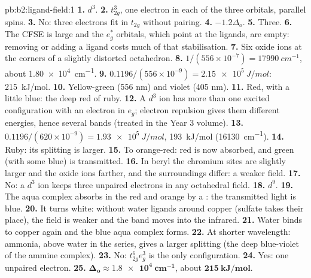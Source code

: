\begin{solution}{pb:b2:ligand-field:1}
\textbf{1.} $d^3$.
\textbf{2.} $t_{2g}^3$, one electron in each of the three orbitals, parallel spins.
\textbf{3.} No: three electrons fit in $t_{2g}$ without pairing.
\textbf{4.} $-1.2\Delta_o$.
\textbf{5.} Three.
\textbf{6.} The CFSE is large and the $e_g^*$ orbitals, which point at the ligands, are
empty: removing or adding a ligand costs much of that stabilisation.
\textbf{7.} Six oxide ions at the corners of a slightly distorted octahedron.
\textbf{8.} $1/(556 \times 10^{-7}) = \qty{17990}{cm^{-1}}$, about \qty{1.80e4}{cm^{-1}}.
\textbf{9.} $0.1196/(556 \times 10^{-9}) = \qty{2.15e5}{J/mol}$: \qty{215}{kJ/mol}.
\textbf{10.} Yellow-green (556 nm) and violet (405 nm).
\textbf{11.} Red, with a little blue: the deep red of ruby.
\textbf{12.} A $d^3$ ion has more than one excited configuration with an electron in $e_g$;
electron repulsion gives them different energies, hence several bands (treated in the
Year 3 volume).
\textbf{13.} $0.1196/(620 \times 10^{-9}) = \qty{1.93e5}{J/mol}$, \qty{193}{kJ/mol}
(\qty{16130}{cm^{-1}}).
\textbf{14.} Ruby: its splitting is larger.
\textbf{15.} To orange-red: red is now absorbed, and green (with some blue) is transmitted.
\textbf{16.} In beryl the chromium sites are slightly larger and the oxide ions farther,
and the surroundings differ: a weaker field.
\textbf{17.} No: a $d^3$ ion keeps three unpaired electrons in any octahedral field.
\textbf{18.} $d^9$.
\textbf{19.} The aqua complex absorbs in the red and orange by a : the
transmitted light is blue.
\textbf{20.} It turns white: without water ligands around copper (sulfate takes their
place), the field is weaker and the band moves into the infrared.
\textbf{21.} Water binds to copper again and the blue aqua complex forms.
\textbf{22.} At shorter wavelength: ammonia, above water in the series, gives a larger
splitting (the deep blue-violet of the ammine complex).
\textbf{23.} No: $t_{2g}^6e_g^3$ is the only configuration.
\textbf{24.} Yes: one unpaired electron.
\textbf{25.} $\boldsymbol{\Delta_o \approx \qty{1.8e4}{cm^{-1}}}$, about
$\boldsymbol{\qty{215}{kJ/mol}}$.
\end{solution}
